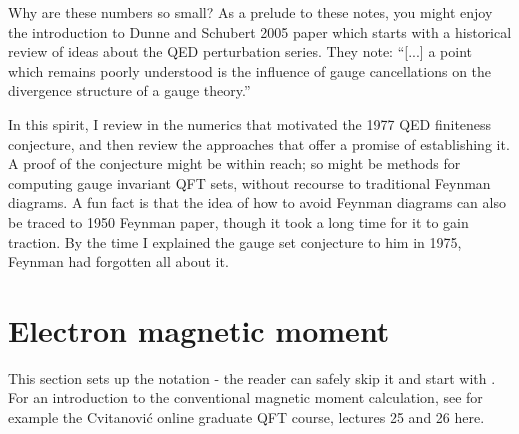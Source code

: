 Why are these numbers so small?
As a prelude to these notes, you might enjoy the
introduction to Dunne and Schubert 2005 paper
which starts with a historical review of ideas about the QED
perturbation series. They note:
``[...]
a point which remains poorly understood is the influence of gauge
cancellations on the divergence structure of a gauge theory.''

In this spirit, I review in  the numerics that
motivated the 1977 QED finiteness conjecture, and then review the
approaches that offer a promise of establishing it. A proof of the
conjecture might be within reach; so might be methods for computing gauge
invariant QFT sets, without recourse to traditional Feynman diagrams.
A fun fact is that the idea of how to avoid Feynman diagrams can also be
traced to 1950 Feynman paper, though it took a long time for
it to gain traction. By the time I explained the gauge set conjecture to
him in 1975, Feynman had forgotten all about it.

\bigskip{}

\section{Electron magnetic moment}
\label{sect:magMom}

\noindent
This section sets up the notation - the reader can safely skip it and
start with . For an introduction to the
conventional magnetic moment calculation, see for example the
Cvitanovi\'c online graduate QFT course, lectures 25 and 26
{here}.

